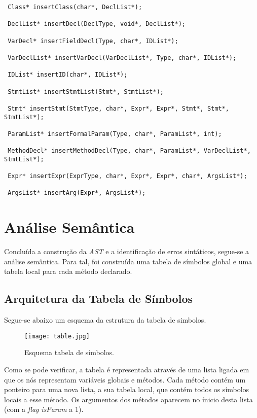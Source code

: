 \documentclass[11pt,a4paper]{article}
\begin{document}
\begin{lstlisting}
 Class* insertClass(char*, DeclList*);
 
 DeclList* insertDecl(DeclType, void*, DeclList*);
 
 VarDecl* insertFieldDecl(Type, char*, IDList*);
 
 VarDeclList* insertVarDecl(VarDeclList*, Type, char*, IDList*);
 
 IDList* insertID(char*, IDList*);
 
 StmtList* insertStmtList(Stmt*, StmtList*);
 
 Stmt* insertStmt(StmtType, char*, Expr*, Expr*, Stmt*, Stmt*,   StmtList*);
 
 ParamList* insertFormalParam(Type, char*, ParamList*, int);
 
 MethodDecl* insertMethodDecl(Type, char*, ParamList*, VarDeclList*, StmtList*);
 
 Expr* insertExpr(ExprType, char*, Expr*, Expr*, char*, ArgsList*);
 
 ArgsList* insertArg(Expr*, ArgsList*);
\end{lstlisting}
\vspace{0.3cm}

\section{Análise Semântica}

Concluída a construção da \textit{AST} e a identificação de erros sintáticos, segue-se a análise semântica. Para tal, foi construída uma tabela de símbolos global e uma tabela local para cada método declarado.

\subsection{Arquitetura da Tabela de Símbolos}

Segue-se abaixo um esquema da estrutura da tabela de simbolos.

\begin{figure}[h!]
    \centering
    \centerline{\texttt{[image: table.jpg]}}
    \caption{Esquema tabela de símbolos.}
\end{figure}

Como se pode verificar, a tabela é representada através de uma lista ligada em que os nós representam variáveis globais e métodos. Cada método contém um ponteiro para uma nova lista, a sua tabela local, que contém todos os símbolos locais a esse método. Os argumentos dos métodos aparecem no ínicio desta lista (com a \textit{flag} \textit{isParam} a 1).
\end{document}
